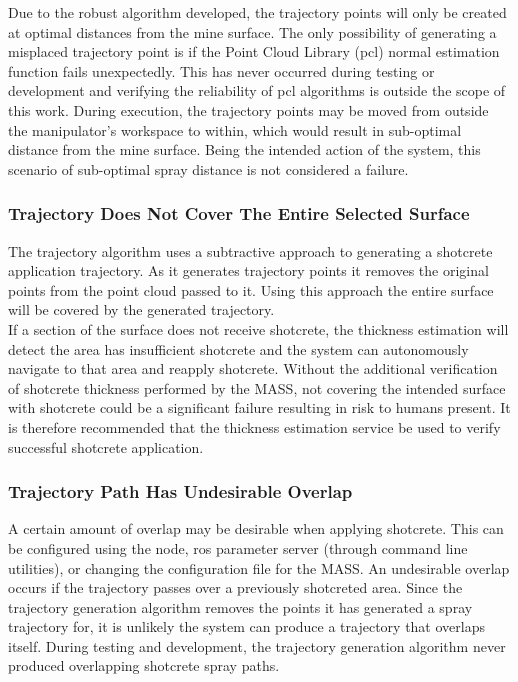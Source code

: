 Due to the robust algorithm developed, the trajectory points will only be created at optimal distances from the mine surface. The only possibility of generating a misplaced trajectory point is if the Point Cloud Library (\acrshort{pcl}) normal estimation function fails unexpectedly. This has never occurred during testing or development and verifying the reliability of \acrshort{pcl} algorithms is outside the scope of this work. During execution, the trajectory points may be moved from outside the manipulator's workspace to within, which would result in sub-optimal distance from the mine surface. Being the intended action of the system, this scenario of sub-optimal spray distance is not considered a failure.\\

\subsubsection{Trajectory Does Not Cover The Entire Selected Surface}

The trajectory algorithm uses a subtractive approach to generating a shotcrete application trajectory. As it generates trajectory points it removes the original points from the point cloud passed to it. Using this approach the entire surface will be covered by the generated trajectory.\\

If a section of the surface does not receive shotcrete, the thickness estimation will detect the area has insufficient shotcrete and the system can autonomously navigate to that area and reapply shotcrete. Without the additional verification of shotcrete thickness performed by the MASS, not covering the intended surface with shotcrete could be a significant failure resulting in risk to humans present. It is therefore recommended that the thickness estimation service be used to verify successful shotcrete application.
\subsubsection{Trajectory Path Has Undesirable Overlap}

A certain amount of overlap may be desirable when applying shotcrete. This can be configured using the  node, \acrshort{ros} parameter server (through command line utilities), or changing the configuration file for the MASS. An undesirable overlap occurs if the trajectory passes over a previously shotcreted area. Since the trajectory generation algorithm removes the points it has generated a spray trajectory for, it is unlikely the system can produce a trajectory that overlaps itself. During testing and development, the trajectory generation algorithm never produced overlapping shotcrete spray paths.\\

